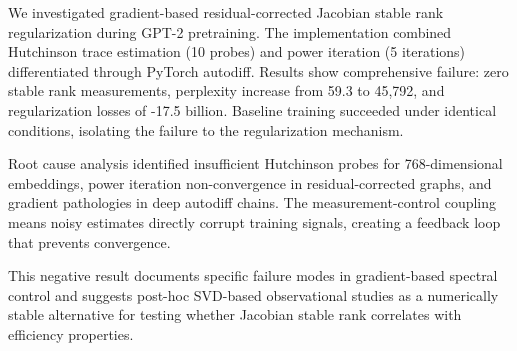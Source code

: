 
We investigated gradient-based residual-corrected Jacobian stable rank regularization during GPT-2 pretraining. The implementation combined Hutchinson trace estimation (10 probes) and power iteration (5 iterations) differentiated through PyTorch autodiff. Results show comprehensive failure: zero stable rank measurements, perplexity increase from 59.3 to 45,792, and regularization losses of -17.5 billion. Baseline training succeeded under identical conditions, isolating the failure to the regularization mechanism.

Root cause analysis identified insufficient Hutchinson probes for 768-dimensional embeddings, power iteration non-convergence in residual-corrected graphs, and gradient pathologies in deep autodiff chains. The measurement-control coupling means noisy estimates directly corrupt training signals, creating a feedback loop that prevents convergence.

This negative result documents specific failure modes in gradient-based spectral control and suggests post-hoc SVD-based observational studies as a numerically stable alternative for testing whether Jacobian stable rank correlates with efficiency properties.

